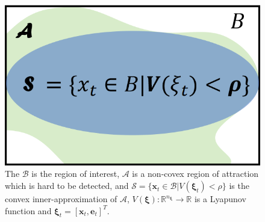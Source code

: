 \documentclass[conference]{IEEEtran}
\newcommand{\myvec}[1]{\boldsymbol{#1}}
\newcommand{\calA}{\mathcal{A}}
\newcommand{\calB}{\mathcal{B}}
\newcommand{\calS}{\mathcal{S}}
\newcommand{\bbR}{\mathbb{R}}
\begin{document}
\begin{figure}[htbp]
    \centerline{\includegraphics[width=0.8\columnwidth]{figures/ROA.png}}
    \caption{The $\calB$ is the region of interest, 
    $\calA$ is a non-covex region of attraction which is hard to be detected, 
    and $\calS=\{\myvec{x}_{t}\in \calB | V(\myvec{\xi}_{t}) < \rho\}$ 
    is the convex inner-approximation of $\calA$, 
    $V(\myvec{\xi}):\bbR^{n_{\myvec{\xi}}} \to \bbR$ 
    is a Lyapunov function and $\myvec{\xi}_{t} = [\myvec{x}_{t}, \myvec{e}_{t}]^{T}$. }
    \label{fig:roa}
\end{figure}
\end{document}
